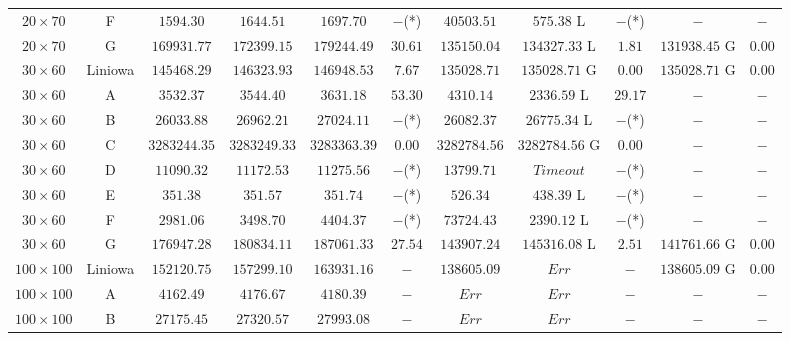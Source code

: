 \begin{table}[h!]
\begin{center}
{\begin{tabular}{c|c|c|c|c|c|c|c|c|c|c}
            $20 \times 70$ & F             & $1594.30$ & $1644.51$ & $1697.70$ & $-$(*)         & $40503.51$    & $575.38$ L & $-$(*)             & $-$ & $-$ \\
            $20 \times 70$ & G             & $169931.77$ & $172399.15$ & $179244.49$ & $30.61$  & $135150.04$   & $134327.33$ L & $1.81$          & $131938.45$ G & $0.00$ \\
            \hline  
            $30 \times 60$ & Liniowa       & $145468.29$ & $146323.93$ & $146948.53$ & $7.67$   & $135028.71$   & $135028.71$ G & $0.00$          & $135028.71$ G & $0.00$ \\
            $30 \times 60$ & A             & $3532.37$ & $3544.40$ & $3631.18$ & $53.30$        & $4310.14$     & $2336.59$ L & $29.17$           & $-$ & $-$ \\
            $30 \times 60$ & B             & $26033.88$ & $26962.21$ & $27024.11$ & $-$(*)      & $26082.37$    & $26775.34$ L & $-$(*)           & $-$ & $-$ \\
            $30 \times 60$ & C             & $3283244.35$ & $3283249.33$ & $3283363.39$ & $0.00$& $3282784.56$  & $3282784.56$ G & $0.00$         & $-$ & $-$ \\
            $30 \times 60$ & D             & $11090.32$ & $11172.53$ & $11275.56$ & $-$(*)      & $13799.71$    & $Time out$ & $-$(*)             & $-$ & $-$ \\
            $30 \times 60$ & E             & $351.38$ & $351.57$ & $351.74$ & $-$(*)            & $526.34$      & $438.39$ L & $-$(*)             & $-$ & $-$ \\
            $30 \times 60$ & F             & $2981.06$ & $3498.70$ & $4404.37$ & $-$(*)         & $73724.43$    & $2390.12$ L & $-$(*)            & $-$ & $-$ \\
            $30 \times 60$ & G             & $176947.28$ & $180834.11$ & $187061.33$ & $27.54$  & $143907.24$   & $145316.08$ L & $2.51$          & $141761.66$ G & $0.00$ \\
            \hline  
            $100 \times 100$ & Liniowa     & $152120.75$ & $157299.10$ & $163931.16$ & $-$      & $138605.09$   & $Err$ & $-$                     & $138605.09$ G & $0.00$ \\
            $100 \times 100$ & A           & $4162.49$ & $4176.67$ & $4180.39$ & $-$            & $Err$         & $Err$ & $-$                     & $-$ & $-$ \\
            $100 \times 100$ & B           & $27175.45$ & $27320.57$ & $27993.08$ & $-$         & $Err$         & $Err$ & $-$                     & $-$ & $-$ \\

\end{tabular}}
\end{center}
\end{table}
